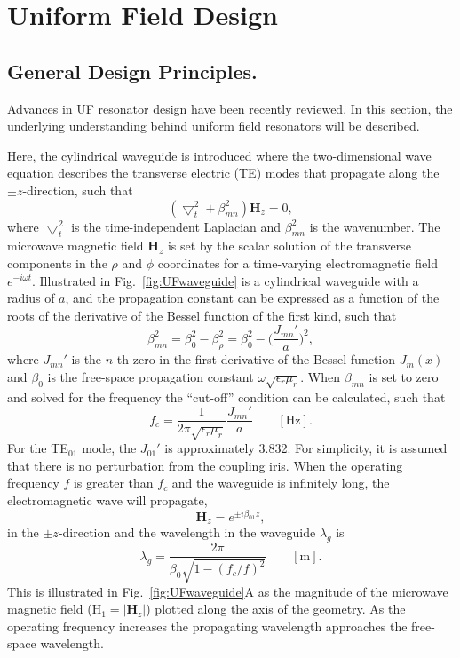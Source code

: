 \section{Uniform Field Design}
\subsection*{General Design Principles.}
Advances in UF resonator design have been recently reviewed. \cite{HydeUFRev2019} In this section, the underlying understanding behind uniform field resonators will be described.

Here, the cylindrical waveguide is introduced where the two-dimensional wave equation describes the transverse electric (TE) modes that propagate along the $\pm z$-direction, such that
\begin{equation}
    (\bigtriangledown_t^2 + \beta_{mn}^2) \mathbf{H}_z = 0,
\end{equation}
where $\bigtriangledown_t^2$ is the time-independent Laplacian and $\beta_{mn}^2$ is the wavenumber. The microwave magnetic field $\mathbf{H}_z$ is set by the scalar solution of the transverse components in the $\rho$ and $\phi$ coordinates for a time-varying electromagnetic field $e^{-i \omega t}$. Illustrated in Fig.~\ref{fig:UFwaveguide} is a cylindrical waveguide with a radius of $a$, and the propagation constant can be expressed as a function of the roots of the derivative of the Bessel function of the first kind, such that
\begin{equation}
    \beta_{mn}^2 = \beta_0^2 - \beta_\rho^2 = \beta_0^2 - \bigg(\frac{J_{mn}'}{a}\bigg)^2,
\end{equation}
where $J_{mn}'$ is the $n$-th zero in the first-derivative of the Bessel function $J_m(x)$ and $\beta_0$ is the free-space propagation constant $\omega\sqrt{\epsilon_r \mu_r}$. When $\beta_{mn}$ is set to zero and solved for the frequency the ``cut-off'' condition can be calculated, such that
\begin{equation}
    f_c = \frac{1}{2 \pi \sqrt{\epsilon_r \mu_r}}\frac{J_{mn}'}{a} \qquad [\text{Hz}].
\end{equation}
For the TE$_{01}$ mode, the $J_{01}'$ is approximately 3.832. For simplicity, it is assumed that there is no perturbation from the coupling iris. When the operating frequency $f$ is greater than $f_c$ and the waveguide is infinitely long, the electromagnetic wave will propagate,
\begin{equation}
    \mathbf{H}_z = e^{\pm i\beta_{01}z},\label{propH}
\end{equation}
in the $\pm z$-direction and the wavelength in the waveguide $\lambda_g$ is 
\begin{equation}
    \lambda_g = \frac{2\pi}{\beta_0 \sqrt{1-(f_c/f)^2}} \qquad [\text{m}].\label{wavelength}
\end{equation}
This is illustrated in Fig.~\ref{fig:UFwaveguide}A as the magnitude of the microwave magnetic field (H$_1 = |\mathbf{H}_z|$) plotted along the axis of the geometry. As the operating frequency increases the propagating wavelength approaches the free-space wavelength. \cite{harrington1961time} 


